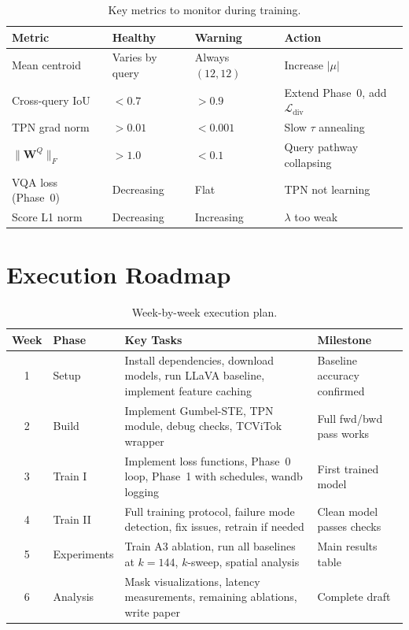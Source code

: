 \documentclass[11pt,a4paper]{article}
\begin{document}
\begin{table}[h]
\centering
\caption{Key metrics to monitor during training.}
\label{tab:diagnostics}
\renewcommand{\arraystretch}{1.2}
\small
\begin{tabular}{@{}llll@{}}
  \toprule
  Metric & Healthy & Warning & Action \\
  \midrule
  Mean centroid & Varies by query & Always $(12,12)$
    & Increase $|\mu|$ \\
  Cross-query IoU & $< 0.7$ & $> 0.9$
    & Extend Phase~0, add $\mathcal{L}_{\text{div}}$ \\
  TPN grad norm & $> 0.01$ & $< 0.001$
    & Slow $\tau$ annealing \\
  $\|\mathbf{W}^Q\|_F$ & $> 1.0$ & $< 0.1$
    & Query pathway collapsing \\
  VQA loss (Phase~0) & Decreasing & Flat
    & TPN not learning \\
  Score L1 norm & Decreasing & Increasing
    & $\lambda$ too weak \\
  \bottomrule
\end{tabular}
\end{table}

\section{Execution Roadmap}
\label{sec:roadmap}

\begin{table}[h]
\centering
\caption{Week-by-week execution plan.}
\label{tab:roadmap}
\renewcommand{\arraystretch}{1.25}
\small
\begin{tabular}{@{}clp{6.5cm}l@{}}
  \toprule
  Week & Phase & Key Tasks & Milestone \\
  \midrule
  1 & Setup &
    Install dependencies, download models, run LLaVA baseline,
    implement feature caching &
    Baseline accuracy confirmed \\
  2 & Build &
    Implement Gumbel-STE, TPN module, debug checks,
    TCViTok wrapper &
    Full fwd/bwd pass works \\
  3 & Train I &
    Implement loss functions, Phase~0 loop,
    Phase~1 with schedules, wandb logging &
    First trained model \\
  4 & Train II &
    Full training protocol, failure mode detection,
    fix issues, retrain if needed &
    Clean model passes checks \\
  5 & Experiments &
    Train A3 ablation, run all baselines at $k{=}144$,
    $k$-sweep, spatial analysis &
    Main results table \\
  6 & Analysis &
    Mask visualizations, latency measurements,
    remaining ablations, write paper &
    Complete draft \\
  \bottomrule
\end{tabular}
\end{table}
\end{document}
